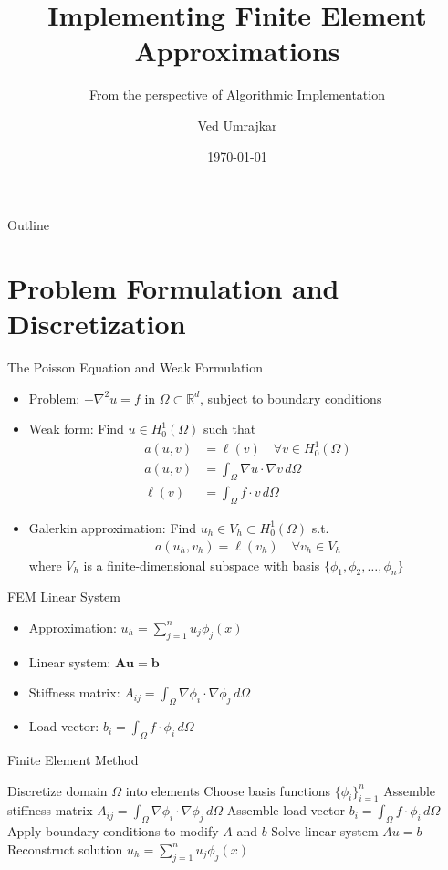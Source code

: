 \documentclass{beamer}
\title{Implementing Finite Element Approximations}
\subtitle{From the perspective of Algorithmic Implementation}
\institute{Department of Mathematics, IIT Roorkee}
\date{\today}
\author{Ved Umrajkar}
\begin{document}
\begin{frame}
\titlepage
\end{frame}

\begin{frame}{Outline}
\tableofcontents
\end{frame}

\section{Problem Formulation and Discretization}

\begin{frame}{The Poisson Equation and Weak Formulation}
\begin{itemize}
    \item Problem: $-\nabla^2 u = f$ in $\Omega \subset \mathbb{R}^d$, subject to boundary conditions
    \item Weak form: Find $u \in H^1_0(\Omega)$ such that
    \begin{align}
    a(u,v) &= \ell(v) \quad \forall v \in H^1_0(\Omega)\\
    a(u,v) &= \int_\Omega \nabla u \cdot \nabla v \, d\Omega\\
    \ell(v) &= \int_\Omega f \cdot v \, d\Omega
    \end{align}
    \item Galerkin approximation: Find $u_h \in V_h \subset H^1_0(\Omega)$ s.t.
    \begin{align}
    a(u_h, v_h) = \ell(v_h) \quad \forall v_h \in V_h
    \end{align}
    where $V_h$ is a finite-dimensional subspace with basis $\{\phi_1, \phi_2, \ldots, \phi_n\}$
\end{itemize}
\end{frame}

\begin{frame}{FEM Linear System}
\begin{itemize}
    \item Approximation: $u_h = \sum_{j=1}^n u_j \phi_j(x)$
    \item Linear system: $\mathbf{A}\mathbf{u} = \mathbf{b}$
    \item Stiffness matrix: $A_{ij} = \int_\Omega \nabla \phi_i \cdot \nabla \phi_j \, d\Omega$
    \item Load vector: $b_i = \int_\Omega f \cdot \phi_i \, d\Omega$
\end{itemize}

\begin{algorithm}[H]
\caption{Finite Element Method}
\begin{algorithmic}[1]
\State Discretize domain $\Omega$ into elements
\State Choose basis functions $\{\phi_i\}_{i=1}^n$
\State Assemble stiffness matrix $A_{ij} = \int_\Omega \nabla \phi_i \cdot \nabla \phi_j \, d\Omega$
\State Assemble load vector $b_i = \int_\Omega f \cdot \phi_i \, d\Omega$
\State Apply boundary conditions to modify $A$ and $b$
\State Solve linear system $Au = b$
\State Reconstruct solution $u_h = \sum_{j=1}^n u_j \phi_j(x)$
\end{algorithmic}
\end{algorithm}
\end{frame}
\end{document}
